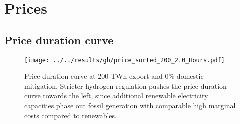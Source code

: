 
\section{Prices}






\subsection{Price duration curve}
\begin{figure*}[h]
    \centering
    \texttt{[image: ../../results/gh/price\_sorted\_200\_2.0\_Hours.pdf]}
    \caption{Price duration curve at 200 TWh export and 0\% domestic mitigation. Stricter hydrogen regulation pushes the price duration curve towards the left, since additional renewable electricity capacities phase out fossil generation with comparable high marginal costs compared to renewables.}
    \label{fig:pdc-200-0}
\end{figure*}




